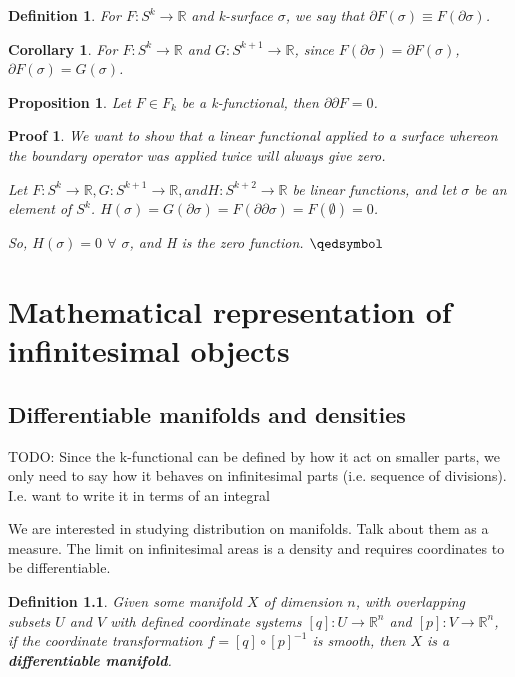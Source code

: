 \documentclass{book}
\newtheorem{defn}[equation]{Definition}
\newtheorem{coro}[equation]{Corollary}
\newtheorem{prop}[equation]{Proposition}
\newtheorem{prf}[equation]{Proof}
\begin{document}
\begin{defn}
	For $F : S^k \to \mathbb{R}$ and k-surface $\sigma$, we say that $\partial F(\sigma) \equiv F(\partial\sigma)$. 
\end{defn}

\begin{coro}
	For $F : S^k \to \mathbb{R}$ and $G : S^{k+1} \to \mathbb{R}$, since $F(\partial\sigma) = \partial F(\sigma)$, $\partial F(\sigma) = G(\sigma)$. 
\end{coro}

\begin{prop}
	Let $F \in F_k$ be a k-functional, then $\partial\partial F = 0 $.
\end{prop}
\begin{prf}
	We want to show that a linear functional applied to a surface whereon the boundary operator was applied twice will always give zero.
	
	Let $F : S^k \to \mathbb{R}, G : S^{k+1} \to \mathbb{R}, and H : S^{k+2} \to \mathbb{R}$ be linear functions, and let $\sigma$ be an element of $S^k$. $H(\sigma) = G(\partial\sigma) = F(\partial\partial\sigma) = F(\emptyset) = 0$. 
	
	So, $H(\sigma) = 0$ $\forall$ $\sigma$, and H is the zero function. 
	$\qedsymbol$
\end{prf}






\chapter{Mathematical representation of infinitesimal objects}



\section{Differentiable manifolds and densities}

TODO: Since the k-functional can be defined by how it act on smaller parts, we only need to say how it behaves on infinitesimal parts (i.e. sequence of divisions). I.e. want to write it in terms of an integral

We are interested in studying distribution on manifolds. Talk about them as a measure. The limit on infinitesimal areas is a density and requires coordinates to be differentiable.


\begin{defn}
	Given some manifold $X$ of dimension $n$, with overlapping subsets $U$ and $V$ with defined coordinate systems $[q]: U \to \mathbb{R}^n$ and $[p]: V \to \mathbb{R}^n$, if the coordinate transformation $f = [q] \circ [p]^{-1}$ is smooth, then $X$ is a \textbf{differentiable manifold}. 
\end{defn}
\end{document}
